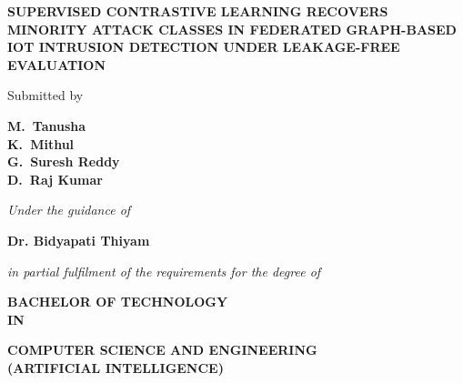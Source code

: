 \documentclass[12pt,a4paper]{report}
\begin{document}
\thispagestyle{plain}
\begin{center}
    \vspace*{0.2cm}
    {\fontsize{14}{18}\selectfont \textbf{\color{amritared} SUPERVISED CONTRASTIVE LEARNING RECOVERS MINORITY ATTACK CLASSES IN FEDERATED GRAPH-BASED IOT INTRUSION DETECTION UNDER LEAKAGE-FREE EVALUATION}\par}
    
    \vspace{0.8cm}
    {\fontsize{12}{14}\selectfont Submitted by\par}
    
    \vspace{0.4cm}
    {\fontsize{12}{16}\selectfont \textbf{\color{amritared}
    M.~Tanusha \quad [AV.SC.U4AIE23030]\\
    K.~Mithul \quad [AV.SC.U4AIE23025]\\
    G.~Suresh Reddy \quad [AV.SC.U4AIE23014]\\
    D.~Raj Kumar \quad [AV.SC.U4AIE23010]
    }\par}
    
    \vspace{0.6cm}
    {\fontsize{12}{14}\selectfont \textit{Under the guidance of}\par}
    
    \vspace{0.2cm}
    {\fontsize{12}{15}\selectfont \textbf{\color{amritared} Dr. Bidyapati Thiyam}\par}
    
    \vspace{0.6cm}
    {\fontsize{11}{13}\selectfont \textit{in partial fulfilment of the requirements for the degree of}\par}
    
    \vspace{0.4cm}
    {\fontsize{13}{16}\selectfont \textbf{BACHELOR OF TECHNOLOGY}\\\textbf{IN}\par}
    
    \vspace{0.2cm}
    {\fontsize{11}{14}\selectfont \textbf{\color{amritared} COMPUTER SCIENCE AND ENGINEERING\\(ARTIFICIAL INTELLIGENCE)}\par}
    

\end{center}
\end{document}
